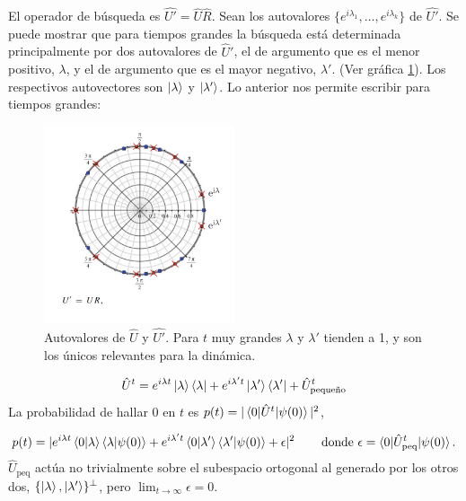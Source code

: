 El operador de búsqueda es $\hat{U'}=\hat{U}\hat{R}$. Sean los autovalores $\{e^{i\lambda_1},\dots, e^{i\lambda_k}\}$ de $\hat{U'}$. Se puede mostrar que para tiempos grandes la búsqueda está determinada principalmente por dos autovalores de $\hat{U}'$, el de argumento que es el menor positivo, $\lambda$, y el de argumento que es el mayor negativo, $\lambda'$. (Ver gráfica \ref{gr:EspectroBusqueda}). Los respectivos autovectores son $\ket{\lambda}$ y $\ket{\lambda'}$. Lo anterior nos permite escribir para tiempos grandes:
\begin{figure}[ht]
\centering
\includegraphics[width=0.5\textwidth]{Kap5/SpatialSearchUprimePortugal.png}
\caption{Autovalores de $\hat{U}$ y $\hat{U'}$. Para $t$ muy grandes $\lambda$ y $\lambda'$ tienden a 1, y son los únicos relevantes para la dinámica.
\cite{portugal2013quantum}}
\label{gr:EspectroBusqueda}
\end{figure}
\begin{equation}
    \hat{U}^t=e^{i\lambda t}\ket{\lambda}\bra{\lambda}+e^{i\lambda't}\ket{ \lambda'}\bra{\lambda'}+\hat{U}_{\text{pequeño}}^t
\end{equation}{}
La probabilidad de hallar $0$ en $t$ es $p(t)=|\braket{0|\hat{U}^t|\psi(0)}|^2$, 

\begin{equation}
    p(t)=|e^{i\lambda t}\braket{0|\lambda}\braket{\lambda|\psi(0)}+e^{i\lambda't}\braket{0|\lambda'}\braket{\lambda'|\psi(0)}+\epsilon|^2
    \label{ec:ProbEigenphaseDeco}\,\qquad\text{donde}\,\,\epsilon=\braket{0|\hat{U}^t_{\text{peq}}|\psi(0)}.
\end{equation}
$\hat{U}_{\text{peq}}$ actúa no trivialmente sobre el subespacio ortogonal al generado por los otros dos, $\{\ket{\lambda},\ket{\lambda'}\}^{\perp}$, pero $\lim_{t\xrightarrow{}\infty}\epsilon=0$.\\

